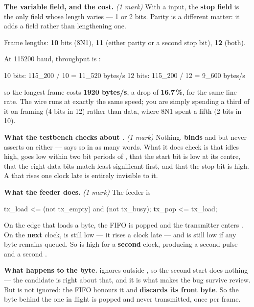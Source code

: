 \textbf{The variable field, and the cost.} \textit{(1 mark)} With a  input, the
\textbf{stop field} is the only field whose length varies --- 1 or 2 bits. Parity is a different
matter: it adds a field rather than lengthening one.

Frame lengths: \textbf{10} bits (8N1), \textbf{11} (either parity or a second stop bit), \textbf{12}
(both).

At 115200 baud, throughput is :

\begin{console}
10 bits: 115_200 / 10 = 11_520 bytes/s
12 bits: 115_200 / 12 =  9_600 bytes/s
\end{console}

\noindent so the longest frame costs \textbf{1920 bytes/s}, a drop of \textbf{16.7\,\%}, for the
same line rate. The wire runs at exactly the same speed; you are simply spending a third of it on
framing (4 bits in 12) rather than data, where 8N1 spent a fifth (2 bits in 10).

\textbf{What the testbench checks about .} \textit{(1 mark)} Nothing. 
\textbf{binds}  and  but never asserts on either ---  says so
in as many words. What it does check is that  idles high, goes low within two bit periods
of , that the start bit is low at its centre, that the eight data bits match least
significant first, and that the stop bit is high. A  that rises one clock late is
entirely invisible to it.

\textbf{What the feeder does.} \textit{(1 mark)} The feeder is

\begin{vhdlcode}
tx_load <= (not tx_empty) and (not tx_busy);
tx_pop  <= tx_load;
\end{vhdlcode}

\noindent On the edge that loads a byte, the FIFO is popped and the transmitter enters
. On the \textbf{next} clock,  is still low --- it rises a clock late
--- and  is still low if any byte remains queued. So  is high for a
\textbf{second} clock, producing a second  pulse and a second .

\textbf{What happens to the byte.}  ignores  outside , so
the second start does nothing --- the candidate is right about that, and it is what makes the bug
survive review. But  is not ignored: the FIFO honours it and \textbf{discards its front
byte}. So the byte behind the one in flight is popped and never transmitted, once per frame.

